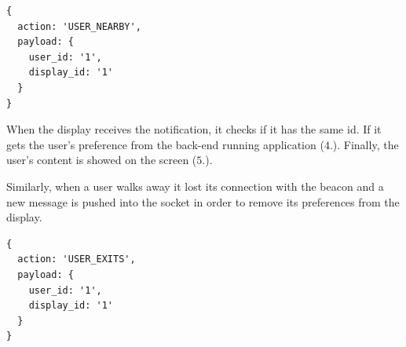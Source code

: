 \documentclass[]{usiinfbachelorproject}
\begin{document}
 \begin{lstlisting}
{
  action: 'USER_NEARBY',
  payload: {
    user_id: '1',
    display_id: '1'
  }
}
 \end{lstlisting}
 
When the display receives the notification, it checks if it has the same id. If it gets the user's preference from the back-end running application ($4.$). Finally, the user's content is showed on the screen ($5.$).

Similarly, when a user walks away it lost its connection with the beacon and a new message is pushed into the socket in order to remove its preferences from the display.
 \begin{lstlisting}
{
  action: 'USER_EXITS',
  payload: {
    user_id: '1',
    display_id: '1'
  }
}
 \end{lstlisting}
\end{document}
